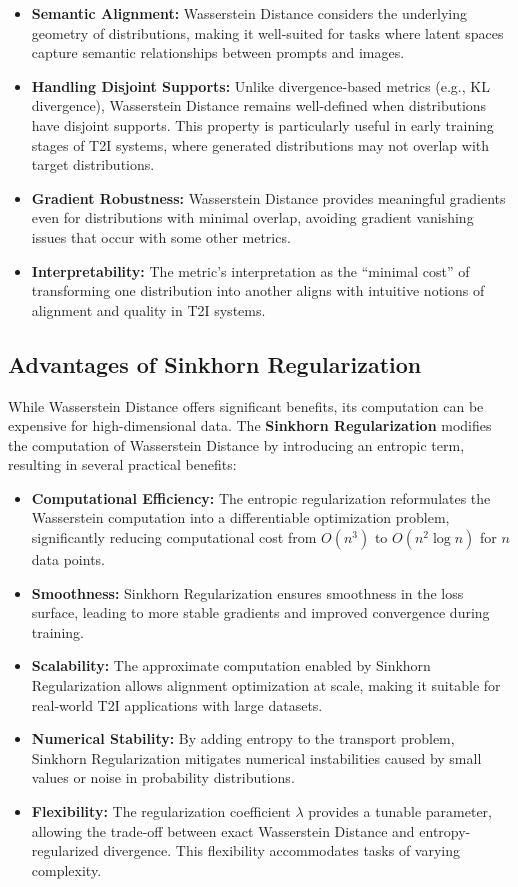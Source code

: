 \begin{itemize}
    \item \textbf{Semantic Alignment:} Wasserstein Distance considers the underlying geometry of distributions, making it well-suited for tasks where latent spaces capture semantic relationships between prompts and images.
    \item \textbf{Handling Disjoint Supports:} Unlike divergence-based metrics (e.g., KL divergence), Wasserstein Distance remains well-defined when distributions have disjoint supports. This property is particularly useful in early training stages of T2I systems, where generated distributions may not overlap with target distributions.
    \item \textbf{Gradient Robustness:} Wasserstein Distance provides meaningful gradients even for distributions with minimal overlap, avoiding gradient vanishing issues that occur with some other metrics.
    \item \textbf{Interpretability:} The metric’s interpretation as the “minimal cost” of transforming one distribution into another aligns with intuitive notions of alignment and quality in T2I systems.
\end{itemize}


\subsection{Advantages of Sinkhorn Regularization}

While Wasserstein Distance offers significant benefits, its computation can be expensive for high-dimensional data. The \textbf{Sinkhorn Regularization} modifies the computation of Wasserstein Distance by introducing an entropic term, resulting in several practical benefits:

\begin{itemize}
    \item \textbf{Computational Efficiency:} The entropic regularization reformulates the Wasserstein computation into a differentiable optimization problem, significantly reducing computational cost from \(O(n^3)\) to \(O(n^2 \log n)\) for \(n\) data points.
    \item \textbf{Smoothness:} Sinkhorn Regularization ensures smoothness in the loss surface, leading to more stable gradients and improved convergence during training.
    \item \textbf{Scalability:} The approximate computation enabled by Sinkhorn Regularization allows alignment optimization at scale, making it suitable for real-world T2I applications with large datasets.
    \item \textbf{Numerical Stability:} By adding entropy to the transport problem, Sinkhorn Regularization mitigates numerical instabilities caused by small values or noise in probability distributions.
    \item \textbf{Flexibility:} The regularization coefficient \(\lambda\) provides a tunable parameter, allowing the trade-off between exact Wasserstein Distance and entropy-regularized divergence. This flexibility accommodates tasks of varying complexity.
\end{itemize}


